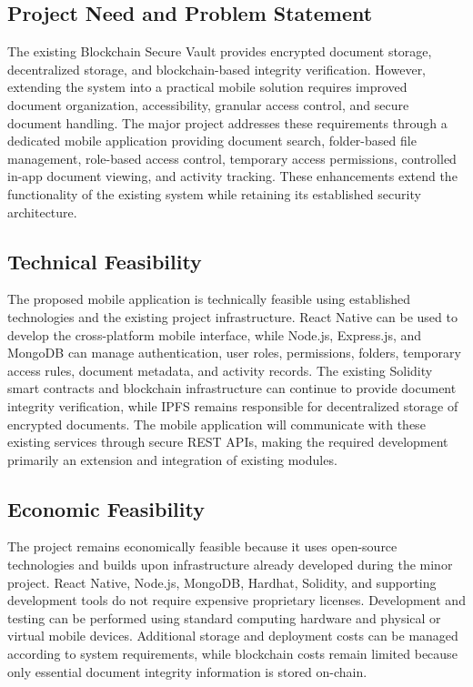 \documentclass[12pt]{article}
\begin{document}
\subsection{Project Need and Problem Statement}
The existing Blockchain Secure Vault provides encrypted document storage, decentralized storage, and blockchain-based integrity verification. However, extending the system into a practical mobile solution requires improved document organization, accessibility, granular access control, and secure document handling. The major project addresses these requirements through a dedicated mobile application providing document search, folder-based file management, role-based access control, temporary access permissions, controlled in-app document viewing, and activity tracking. These enhancements extend the functionality of the existing system while retaining its established security architecture.

\subsection{Technical Feasibility}
The proposed mobile application is technically feasible using established technologies and the existing project infrastructure. React Native can be used to develop the cross-platform mobile interface, while Node.js, Express.js, and MongoDB can manage authentication, user roles, permissions, folders, temporary access rules, document metadata, and activity records. The existing Solidity smart contracts and blockchain infrastructure can continue to provide document integrity verification, while IPFS remains responsible for decentralized storage of encrypted documents. The mobile application will communicate with these existing services through secure REST APIs, making the required development primarily an extension and integration of existing modules.

\subsection{Economic Feasibility}
The project remains economically feasible because it uses open-source technologies and builds upon infrastructure already developed during the minor project. React Native, Node.js, MongoDB, Hardhat, Solidity, and supporting development tools do not require expensive proprietary licenses. Development and testing can be performed using standard computing hardware and physical or virtual mobile devices. Additional storage and deployment costs can be managed according to system requirements, while blockchain costs remain limited because only essential document integrity information is stored on-chain.
\end{document}
